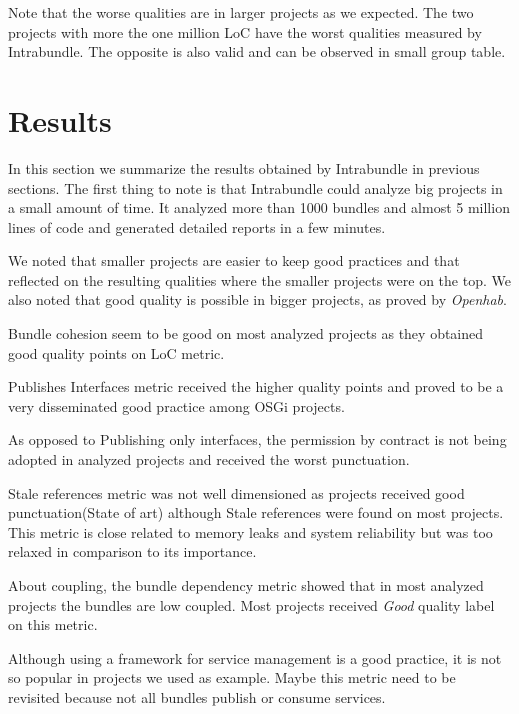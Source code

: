 Note that the worse qualities are in larger projects as we expected. The two projects with more the one million LoC have the worst qualities measured by Intrabundle. The opposite is also valid and can be observed in small group table. 

\section{Results}
In this section we summarize the results obtained by Intrabundle in previous sections. 
The first thing to note is that Intrabundle could analyze big projects in a small amount of time. It analyzed more than 1000 bundles and almost 5 million lines of code and generated detailed reports in a few minutes.

We noted that smaller projects are easier to keep good practices and that reflected on the resulting qualities where the smaller projects were on the top. We also noted that good quality is possible in bigger projects, as proved by \emph{Openhab}.

Bundle cohesion seem to be good on most analyzed projects as they obtained good quality points on LoC metric.

Publishes Interfaces metric received the higher quality points and proved to be a very disseminated good practice among OSGi projects.

As opposed to Publishing only interfaces, the permission by contract is not being adopted in analyzed projects and received the worst punctuation.

Stale references metric was not well dimensioned as projects received good punctuation(State of art) although Stale references were found on most projects. This metric is close related to memory leaks and system reliability but was too relaxed in comparison to its importance. 

About coupling, the bundle dependency metric showed that in most analyzed projects the bundles are low coupled. Most projects received \emph{Good} quality label on this metric.

Although using a framework for service management is a good practice, it is not so popular in projects we used as example. Maybe this metric need to be revisited because not all bundles publish or consume services.

